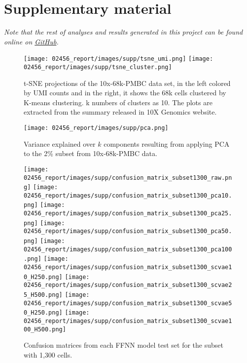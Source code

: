 \documentclass{article}
\begin{document}
\section*{Supplementary material}


\begin{center}
  \textit{Note that the rest of analyses and results generated in this project can be found online on \href{https://github.com/laurasansc/02456_scVAE}{GitHub}.}  
\end{center}

\begin{figure}[h!]
    \centering
    \texttt{[image: 02456\_report/images/supp/tsne\_umi.png]}
    \texttt{[image: 02456\_report/images/supp/tsne\_cluster.png]}
    \caption{t-SNE projections of the 10x-68k-PMBC data set, in the left colored by UMI counts and in the right, it shows the 68k cells clustered by K-means clustering. k numbers of clusters as 10. The plots are extracted from the summary released in 10X Genomics website.}
    \label{sfig:dataset}
\end{figure}

\begin{figure}[h!]
    \centering
    \texttt{[image: 02456\_report/images/supp/pca.png]}
    \caption{Variance explained over $k$ components resulting from applying PCA to the 2\% subset from 10x-68k-PMBC data.}
    \label{sfig:pca}
\end{figure} 


\begin{figure}[h!]
    \centering
    \texttt{[image: 02456\_report/images/supp/confusion\_matrix\_subset1300\_raw.png]}
    \texttt{[image: 02456\_report/images/supp/confusion\_matrix\_subset1300\_pca10.png]}
    \texttt{[image: 02456\_report/images/supp/confusion\_matrix\_subset1300\_pca25.png]}
    \texttt{[image: 02456\_report/images/supp/confusion\_matrix\_subset1300\_pca50.png]}
    \texttt{[image: 02456\_report/images/supp/confusion\_matrix\_subset1300\_pca100.png]}
    \texttt{[image: 02456\_report/images/supp/confusion\_matrix\_subset1300\_scvae10\_H250.png]}
    \texttt{[image: 02456\_report/images/supp/confusion\_matrix\_subset1300\_scvae25\_H500.png]}
    \texttt{[image: 02456\_report/images/supp/confusion\_matrix\_subset1300\_scvae50\_H250.png]}
    \texttt{[image: 02456\_report/images/supp/confusion\_matrix\_subset1300\_scvae100\_H500.png]}
    \caption{Confusion matrices from each FFNN model test set for the subset with 1,300 cells. }
    \label{sfig:confusions1300}
\end{figure}
\end{document}
